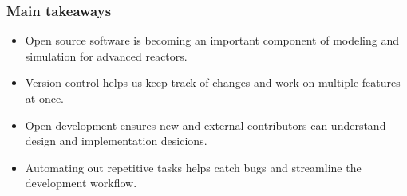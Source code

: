 \begin{frame}
    \frametitle{Main takeaways}
    \begin{itemize}
        \item Open source software is becoming an important component of modeling and simulation for advanced reactors.
        \item Version control helps us keep track of changes and work on multiple features at once.
        \item Open development ensures new and external contributors can understand design and implementation desicions.
        \item Automating out repetitive tasks helps catch bugs and streamline the development workflow. 
    \end{itemize}
\end{frame}
